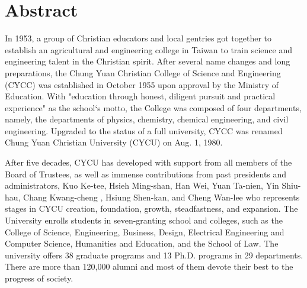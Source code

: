 
\section*{Abstract}
In 1953, a group of Christian educators and local gentries got together to establish an agricultural and engineering college in Taiwan to train science and engineering talent in the Christian spirit. After several name changes and long preparations, the Chung Yuan Christian College of Science and Engineering (CYCC) was established in October 1955 upon approval by the Ministry of Education. With "education through honest, diligent pursuit and practical experience" as the school`s motto, the College was composed of four departments, namely, the departments of physics, chemistry, chemical engineering, and civil engineering. Upgraded to the status of a full university, CYCC was renamed Chung Yuan Christian University (CYCU) on Aug. 1, 1980. 
\par
After five decades, CYCU has developed with support from all members of the Board of Trustees, as well as immense contributions from past presidents and administrators, Kuo Ke-tee, Hsieh Ming-shan, Han Wei, Yuan Ta-nien, Yin Shiu-hau, Chang Kwang-cheng , Hsiung Shen-kan, and Cheng Wan-lee who represents stages in CYCU creation, foundation, growth, steadfastness, and expansion. The University enrolls students in seven-granting school and colleges, such as the College of Science, Engineering, Business, Design, Electrical Engineering and Computer Science, Humanities and Education, and the School of Law. The university offers 38 graduate programs and 13 Ph.D. programs in 29 departments. There are more than 120,000 alumni and most of them devote their best to the progress of society. 
\par
\clearpage